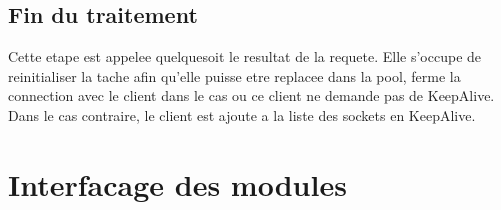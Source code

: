 \subsection {Fin du traitement}
Cette etape est appelee quelquesoit le resultat de la requete. Elle s'occupe de reinitialiser la tache afin qu'elle puisse etre replacee dans la pool, ferme la connection avec le client dans le cas ou ce client ne demande pas de KeepAlive. Dans le cas contraire, le client est ajoute a la liste des sockets en KeepAlive.
\newpage
\section {Interfacage des modules}

    \begin{figure}[h!]
    \end{figure}

